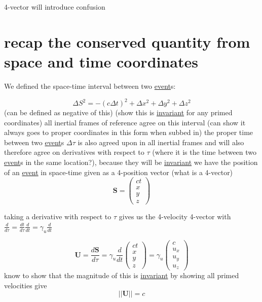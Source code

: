 4-vector will introduce confusion

\section{recap the conserved quantity from space and time coordinates}

We defined the space-time interval between two \hyperlink{def-event}{event}s:

\begin{equation}
	\Delta S^2 = -(c\Delta t)^2 +\Delta x^2 +\Delta y^2 +\Delta z^2
\end{equation}
(can be defined as negative of this) (show this is \hyperlink{def-lorentz-invariant}{invariant} for any primed coordinates)
all inertial frames of reference agree on this interval (can show it always goes to proper coordinates in this form when subbed in)
the proper time between two \hyperlink{def-event}{event}s $\Delta\tau$ is also agreed upon in all inertial frames
and will also therefore agree on derivatives with respect to $\tau$ (where it is the time between two \hyperlink{def-event}{event}s in the same location?), because they will be \hyperlink{def-lorentz-invariant}{invariant}
we have the position of an \hyperlink{def-event}{event} in space-time given as a 4-position vector (what is a 4-vector)
\begin{equation}
	\mathbf{S} =
	\begin{pmatrix}
		ct \\x\\y\\z
	\end{pmatrix}
\end{equation}

taking a derivative with respect to $\tau$ gives us the 4-velocity 4-vector with $\frac{d}{d\tau} = \frac{dt}{d\tau}\frac{d}{dt} = \gamma_u \frac{d}{dt} $

\begin{equation}
	\mathbf{U} = \frac{d\mathbf{S}}{d\tau} = \gamma_u \frac{d}{dt}
	\begin{pmatrix}
		ct \\x\\y\\z
	\end{pmatrix} = \gamma_u
	\begin{pmatrix}
		c \\ u_x \\ u_y \\ u_z
	\end{pmatrix}
\end{equation}
know to show that the magnitude of this is \hyperlink{def-lorentz-invariant}{invariant} by showing all primed velocities give
\begin{equation}
	||\mathbf{U}|| = c
\end{equation}

